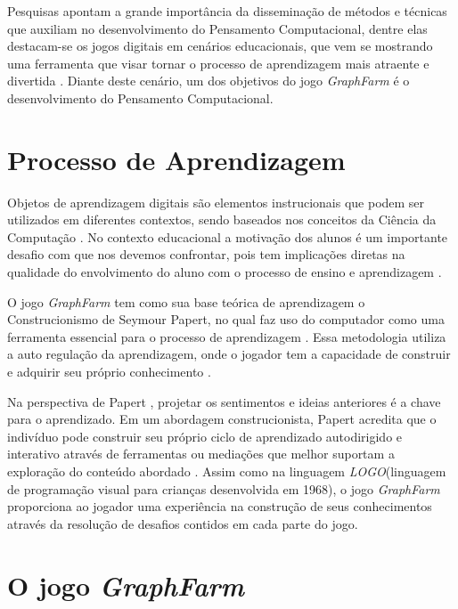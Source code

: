 \documentclass[10pt, conference, compsocconf]{IEEEtran}
\begin{document}
Pesquisas apontam a grande importância da disseminação de métodos e técnicas que auxiliam no desenvolvimento do Pensamento Computacional, dentre elas destacam-se os jogos digitais em cenários educacionais, que vem se mostrando uma ferramenta que visar tornar o processo de aprendizagem mais atraente e divertida \cite{savi2008jogos}. Diante deste cenário, um dos objetivos do jogo \textit{GraphFarm} é o desenvolvimento do Pensamento Computacional. 

\section{Processo de Aprendizagem}

Objetos de aprendizagem digitais são elementos instrucionais que podem ser utilizados em diferentes contextos, sendo baseados nos conceitos da Ciência da Computação \cite{denning2009beyond}. No contexto educacional a motivação dos alunos é um importante desafio com que nos devemos confrontar, pois tem implicações diretas na qualidade do envolvimento do aluno com o processo de ensino e aprendizagem \cite{lourencco2010motivaccao}.

O jogo \textit{GraphFarm} tem como sua base teórica de aprendizagem o Construcionismo de Seymour Papert, no qual faz uso do computador como uma ferramenta essencial para o processo de aprendizagem \cite{papert1994maquina}. Essa metodologia utiliza a auto regulação da aprendizagem, onde o jogador tem a capacidade de construir e adquirir seu próprio conhecimento \cite{alencar2019looking}.

Na perspectiva de Papert , projetar os sentimentos e ideias anteriores é a chave para o aprendizado. Em um abordagem construcionista, Papert acredita que o indivíduo pode construir seu próprio ciclo de aprendizado autodirigido e interativo através de ferramentas ou mediações que melhor suportam a exploração do conteúdo abordado \cite{ackermann2001piaget}. Assim como na linguagem \textit{LOGO}(linguagem de programação visual para crianças desenvolvida em 1968), o jogo \textit{GraphFarm} proporciona ao jogador uma experiência na construção de seus conhecimentos através da resolução de desafios contidos em cada parte do jogo.

\section{O jogo \textit{GraphFarm}}
\end{document}
